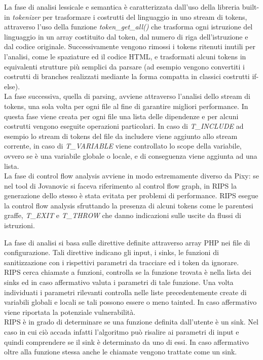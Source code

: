 La fase di analisi lessicale e semantica è caratterizzata dall'uso della libreria built-in \emph{tokenizer} per trasformare i costrutti del linguaggio in uno stream di tokens, attraverso l'uso della funzione \emph{token\_get\_all()} che trasforma ogni istruzione del linguaggio in un array costituito dal token, dal numero di riga dell'istruzione e dal codice originale. Successivamente vengono rimossi i tokens ritenuti inutili per l'analisi, come le spaziature ed il codice HTML, e trasformati alcuni tokens in equivalenti strutture più semplici da parsare (ad esempio vengono convertiti i costrutti di branches realizzati mediante la forma compatta in classici costrutti if-else).\\
La fase successiva, quella di parsing, avviene attraverso l'analisi dello stream di tokens, una sola volta per ogni file al fine di garantire migliori performance. In questa fase viene creata per ogni file una lista delle dipendenze e per alcuni costrutti vengono eseguite operazioni particolari. In caso di \emph{T\_INCLUDE} ad esempio lo stream di tokens del file da includere viene aggiunto allo stream corrente, in caso di \emph{T\_VARIABLE} viene controllato lo scope della variabile, ovvero se è una variabile globale o locale, e di conseguenza viene aggiunta ad una lista.\\
La fase di control flow analysis avviene in modo estremamente diverso da Pixy: se nel tool di Jovanovic si faceva riferimento al control flow graph, in RIPS la generazione dello stesso è stata evitata per problemi di performance. RIPS esegue la control flow analysis sfruttando la presenza di alcuni tokens come le parentesi graffe, \emph{T\_EXIT} e \emph{T\_THROW} che danno indicazioni sulle uscite da flussi di istruzioni.

La fase di analisi si basa sulle direttive definite attraverso array PHP nei file di configurazione. Tali direttive indicano gli input, i sinks, le funzioni di sanitizzazione con i rispettivi parametri da tracciare ed i token da ignorare.\\
RIPS cerca chiamate a funzioni, controlla se la funzione trovata è nella lista dei sinks ed in caso affermativo valuta i parametri di tale funzione. Una volta individuati i parametri rilevanti controlla nelle liste precedentemente create di variabili globali e locali se tali possono essere o meno tainted. In caso affermativo viene riportata la potenziale vulnerabilità.\\
RIPS è in grado di determinare se una funzione definita dall'utente è un sink. Nel caso in cui ciò accada infatti l'algoritmo può risalire ai parametri di input e quindi comprendere se il sink è determinato da uno di essi. In caso affermativo oltre alla funzione stessa anche le chiamate vengono trattate come un sink.

